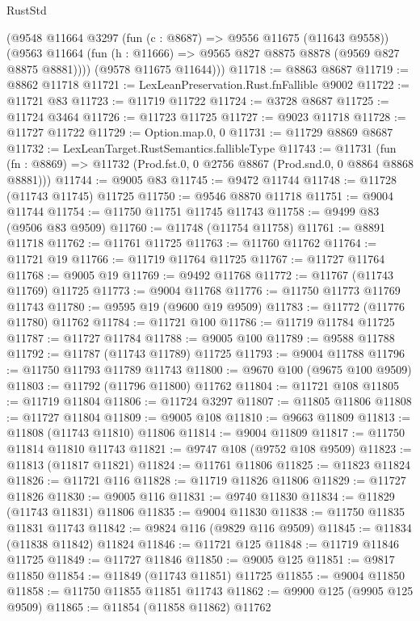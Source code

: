 \begin{lexlean}{RustStd}
\begin{coremodule}
        (@9548
          @11664
          @3297
          (fun (c : @8687) => @9556 @11675 (@11643 @9558))
          (@9563 @11664 (fun (h : @11666) => @9565 @827 @8875 @8878 (@9569 @827 @8875 @8881))))
        (@9578 @11675 @11644)))
@11718 := @8863 @8687
@11719 := @8862 @11718
@11721 := LexLeanPreservation.Rust.fnFallible @9002
@11722 := @11721 @83
@11723 := @11719 @11722
@11724 := @3728 @8687
@11725 := @11724 @3464
@11726 := @11723 @11725
@11727 := @9023 @11718
@11728 := @11727 @11722
@11729 := Option.map.{0, 0}
@11731 := @11729 @8869 @8687
@11732 := LexLeanTarget.RustSemantics.fallibleType
@11743 := @11731
    (fun (fn : @8869) => @11732 (Prod.fst.{0, 0} @2756 @8867 (Prod.snd.{0, 0} @8864 @8868 @8881)))
@11744 := @9005 @83
@11745 := @9472 @11744
@11748 := @11728 (@11743 @11745) @11725
@11750 := @9546 @8870 @11718
@11751 := @9004 @11744
@11754 := @11750 @11751 @11745 @11743
@11758 := @9499 @83 (@9506 @83 @9509)
@11760 := @11748 (@11754 @11758)
@11761 := @8891 @11718
@11762 := @11761 @11725
@11763 := @11760 @11762
@11764 := @11721 @19
@11766 := @11719 @11764 @11725
@11767 := @11727 @11764
@11768 := @9005 @19
@11769 := @9492 @11768
@11772 := @11767 (@11743 @11769) @11725
@11773 := @9004 @11768
@11776 := @11750 @11773 @11769 @11743
@11780 := @9595 @19 (@9600 @19 @9509)
@11783 := @11772 (@11776 @11780) @11762
@11784 := @11721 @100
@11786 := @11719 @11784 @11725
@11787 := @11727 @11784
@11788 := @9005 @100
@11789 := @9588 @11788
@11792 := @11787 (@11743 @11789) @11725
@11793 := @9004 @11788
@11796 := @11750 @11793 @11789 @11743
@11800 := @9670 @100 (@9675 @100 @9509)
@11803 := @11792 (@11796 @11800) @11762
@11804 := @11721 @108
@11805 := @11719 @11804
@11806 := @11724 @3297
@11807 := @11805 @11806
@11808 := @11727 @11804
@11809 := @9005 @108
@11810 := @9663 @11809
@11813 := @11808 (@11743 @11810) @11806
@11814 := @9004 @11809
@11817 := @11750 @11814 @11810 @11743
@11821 := @9747 @108 (@9752 @108 @9509)
@11823 := @11813 (@11817 @11821)
@11824 := @11761 @11806
@11825 := @11823 @11824
@11826 := @11721 @116
@11828 := @11719 @11826 @11806
@11829 := @11727 @11826
@11830 := @9005 @116
@11831 := @9740 @11830
@11834 := @11829 (@11743 @11831) @11806
@11835 := @9004 @11830
@11838 := @11750 @11835 @11831 @11743
@11842 := @9824 @116 (@9829 @116 @9509)
@11845 := @11834 (@11838 @11842) @11824
@11846 := @11721 @125
@11848 := @11719 @11846 @11725
@11849 := @11727 @11846
@11850 := @9005 @125
@11851 := @9817 @11850
@11854 := @11849 (@11743 @11851) @11725
@11855 := @9004 @11850
@11858 := @11750 @11855 @11851 @11743
@11862 := @9900 @125 (@9905 @125 @9509)
@11865 := @11854 (@11858 @11862) @11762

\end{coremodule}
\end{lexlean}
